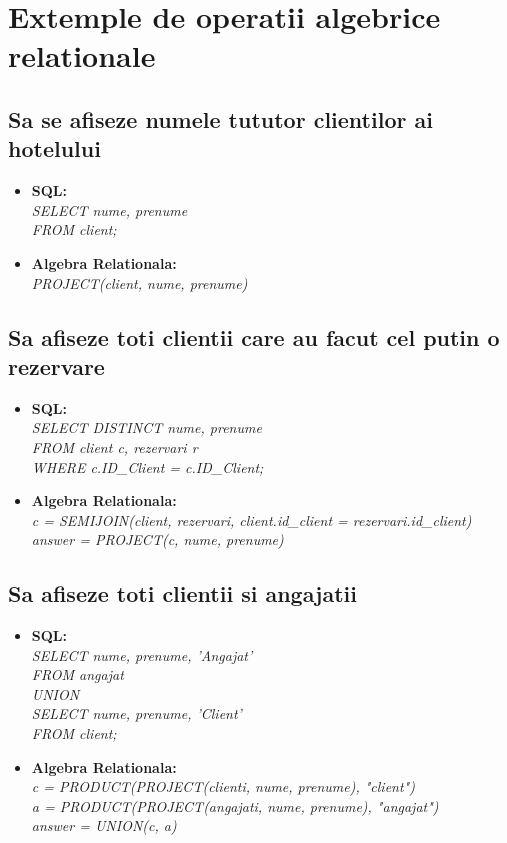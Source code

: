 \documentclass[a4paper,12pt]{article}
\begin{document}
	\section{Extemple de operatii algebrice relationale}
	
	\subsection{Sa se afiseze numele tututor clientilor ai hotelului}
		
		\begin{itemize}
			\item \textbf{SQL:\\}
			\textit{SELECT nume, prenume\\
			FROM client;}
		
			\item \textbf{Algebra Relationala:\\}
			\textit{PROJECT(client, nume, prenume)}
		\end{itemize}	
			
		
	\subsection{Sa afiseze toti clientii care au facut cel putin o rezervare}
		
		\begin{itemize}
			\item \textbf{SQL:\\}
			\textit{SELECT DISTINCT nume, prenume\\
				FROM client c, rezervari r\\
				WHERE c.ID\_Client = c.ID\_Client;}
			
			\item \textbf{Algebra Relationala:\\}
			\textit{c = SEMIJOIN(client, rezervari, client.id\_client = rezervari.id\_client)\\
				answer = PROJECT(c, nume, prenume)}
		\end{itemize}	
		
		\subsection{Sa afiseze toti clientii si angajatii}
		
		\begin{itemize}
			\item \textbf{SQL:\\}
			\textit{SELECT nume, prenume, 'Angajat'\\
				FROM angajat\\
				UNION\\
				SELECT nume, prenume, 'Client'\\
				FROM client;}
			
			\item \textbf{Algebra Relationala:\\}
			\textit{c = PRODUCT(PROJECT(clienti, nume, prenume), "client")\\
				a = PRODUCT(PROJECT(angajati, nume, prenume), "angajat")\\
				answer = UNION(c, a)}
		\end{itemize}	
		
\end{document}
